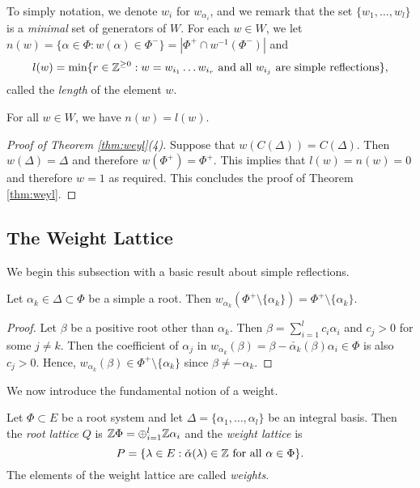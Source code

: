 To simply notation, we denote $w_i$ for $w_{\alpha_i}$, and we remark that the set $\{w_1,\ldots,w_l\}$ is a \textit{minimal} set of generators of $W$. For each $w\in W$, we let $n(w)=\{\alpha\in\Phi:w(\alpha)\in\Phi^-\}=|\Phi^+\cap w^{-1}(\Phi^-)|$
and
$$l(w)=\min\{r\in\mathbb{Z}^{\geq0}:w=w_{i_1}\ldots w_{i_r} \text{ and all } w_{i_j} \text{ are simple reflections}\},$$
called the \textit{length} of the element $w$.

\begin{proposition}
    For all $w\in W$, we have $n(w)=l(w)$.
\end{proposition}

\begin{proof}[Proof of Theorem \ref{thm:weyl}(4)]
    Suppose that $w(C(\Delta))=C(\Delta)$. Then $w(\Delta)=\Delta$ and therefore $w(\Phi^+)=\Phi^+$. This implies that $l(w)=n(w)=0$ and therefore $w=1$ as required. This concludes the proof of Theorem \ref{thm:weyl}.
\end{proof}





\subsection{The Weight Lattice}

We begin this subsection with a basic result about simple reflections.

\begin{lemma}\label{lem:simplereflection}
    Let $\alpha_k\in\Delta\subset\Phi$ be a simple a root. Then $w_{\alpha_k}(\Phi^+\setminus\{\alpha_k\})=\Phi^+\setminus\{\alpha_k\}$.
\end{lemma}

\begin{proof}
    Let $\beta$ be a positive root other than $\alpha_k$. Then $\beta=\sum_{i=1}^{l}c_i\alpha_i$ and $c_j> 0$ for some $j\neq k$. Then the coefficient of $\alpha_j$ in $w_{\alpha_k}(\beta)=\beta-\check{\alpha_k}(\beta)\alpha_i\in\Phi$ is also $c_j>0$. Hence, $w_{\alpha_k}(\beta)\in\Phi^+\setminus\{\alpha_k\}$ since $\beta\neq-\alpha_k$.
\end{proof}

We now introduce the fundamental notion of a weight.

\begin{definition}
    Let $\Phi\subset E$ be a root system and let $\Delta=\{\alpha_1,\ldots,\alpha_l\}$ be an integral basis. Then the \textit{root lattice} $Q$ is $\mathbb{Z}\Phi=\oplus_{i=1}^l\mathbb{Z}\alpha_i$ and the \textit{weight lattice} is 
    $$P=\{\lambda\in E:\check{\alpha}(\lambda)\in\mathbb{Z}\text{ for all }\alpha\in\Phi\}.$$
    The elements of the weight lattice are called \textit{weights}.
\end{definition}

